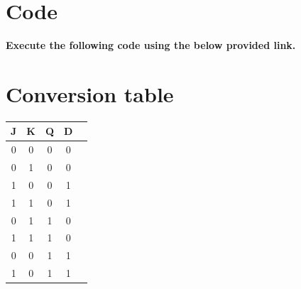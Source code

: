 \documentclass[jornal,10pt,twocolumn]{article}
\begin{document}
\section{Code}
\textbf{Execute the following code using the below provided link.}\\
\begin{center}
\end{center}

\section{Conversion table}

    \centering
    \begin{tabular}{ |c |c |c |c |c |}
\hline
\newline
\textbf{J} & \textbf{K} & \textbf{Q} & \textbf{D} \\
\hline
 0 & 0 & 0 &0 \\  
 0 & 1 & 0 &0 \\ 
 1 & 0 & 0 &1 \\ 
 1 & 1 & 0 &1 \\ 
 0 & 1 & 1 &0 \\ 
 1 & 1 & 1 &0 \\ 
 0 & 0 & 1 &1 \\ 
 1 & 0 & 1 &1 \\ 
 \hline
 \end{tabular}
\label{conversion table}
\end{document}
